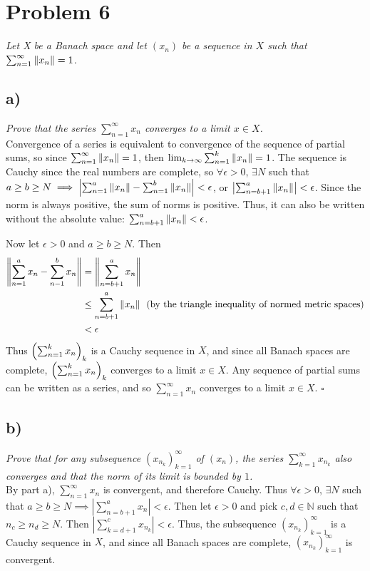 \documentclass[12pt]{article}
\begin{document}
\section*{Problem 6}
{\it Let X be a Banach space and let $(x_n)$ be a sequence in $X$ such that $\sum_{n=1}^\infty \norm{x_n} = 1$.}

\subsection*{ a)}
{\it Prove that the series $\sum_{n=1}^\infty x_n$ converges to a limit $x \in X$.} \\

Convergence of a series is equivalent to convergence of the sequence of partial sums, so since $\sum_{n=1}^\infty \norm{x_n} = 1$, then $\lim_{k\rightarrow\infty}\sum_{n=1}^k \norm{x_n} = 1$.  The sequence is Cauchy since the real numbers are complete, so $\forall\epsilon>0$, $\exists N$ such that $a \geq b \geq N \implies \left|\sum_{n=1}^a \norm{x_n} - \sum_{n=1}^b \norm{x_n}\right| < \epsilon$, or $\left|\sum_{n=b+1}^a \norm{x_n}\right| < \epsilon$.  Since the norm is always positive, the sum of norms is positive.  Thus, it can also be written without the absolute value: $\sum_{n=b+1}^a \norm{x_n} < \epsilon$.

Now let $\epsilon > 0$ and $a \geq b \geq N$.  Then
\begin{align*}
	\norm{\sum_{n=1}^{a} x_n - \sum_{n-1}^{b} x_n} &= \norm{\sum_{n=b+1}^a x_n} \\
	&\leq \sum_{n=b+1}^a \norm{x_n}\ \ \text{(by the triangle inequality of normed metric spaces)} \\
	&< \epsilon
\end{align*}
Thus $\qty(\sum_{n=1}^k x_n)_k$ is a Cauchy sequence in $X$, and since all Banach spaces are complete, $\qty(\sum_{n=1}^k x_n)_k$ converges to a limit $x \in X$.  Any sequence of partial sums can be written as a series, and so $\sum_{n=1}^\infty x_n$ converges to a limit $x \in X$. \hfill $\square$

\subsection*{ b)}
{\it Prove that for any subsequence $(x_{n_k})_{k=1}^\infty$ of $(x_n)$, the series $\sum_{k=1}^\infty x_{n_k}$ also converges and that the norm of its limit is bounded by $1$.} \\

By part a), $\sum_{n=1}^\infty x_n$ is convergent, and therefore Cauchy.  Thus $\forall\epsilon>0$, $\exists N$ such that $a \geq b \geq N \implies \left|\sum_{n=b+1}^{a} x_n\right| < \epsilon$.  Then let $\epsilon>0$ and pick $c,d\in\mathbb{N}$ such that $n_c \geq n_d \geq N$.  Then $\left|\sum_{k=d+1}^{c} x_{n_k}\right| < \epsilon$.  Thus, the subsequence $(x_{n_k})_{k=1}^\infty$ is a Cauchy sequence in $X$, and since all Banach spaces are complete, $(x_{n_k})_{k=1}^\infty$ is convergent.
\end{document}
